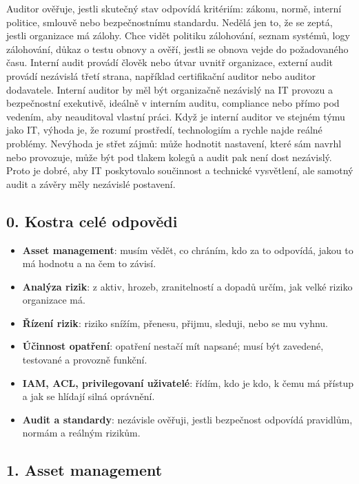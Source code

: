 \begin{beigebox}
Auditor ověřuje, jestli skutečný stav odpovídá kritériím: zákonu, normě, interní politice, smlouvě nebo bezpečnostnímu standardu. Nedělá jen to, že se zeptá, jestli organizace má zálohy. Chce vidět politiku zálohování, seznam systémů, logy zálohování, důkaz o testu obnovy a ověří, jestli se obnova vejde do požadovaného času. Interní audit provádí člověk nebo útvar uvnitř organizace, externí audit provádí nezávislá třetí strana, například certifikační auditor nebo auditor dodavatele. Interní auditor by měl být organizačně nezávislý na IT provozu a bezpečnostní exekutivě, ideálně v interním auditu, compliance nebo přímo pod vedením, aby neauditoval vlastní práci. Když je interní auditor ve stejném týmu jako IT, výhoda je, že rozumí prostředí, technologiím a rychle najde reálné problémy. Nevýhoda je střet zájmů: může hodnotit nastavení, které sám navrhl nebo provozuje, může být pod tlakem kolegů a audit pak není dost nezávislý. Proto je dobré, aby IT poskytovalo součinnost a technické vysvětlení, ale samotný audit a závěry měly nezávislé postavení.
\end{beigebox}

\subsection*{0. Kostra celé odpovědi}

\begin{itemize}
    \item \textbf{Asset management}: musím vědět, co chráním, kdo za to odpovídá, jakou to má hodnotu a na čem to závisí.
    \item \textbf{Analýza rizik}: z aktiv, hrozeb, zranitelností a dopadů určím, jak velké riziko organizace má.
    \item \textbf{Řízení rizik}: riziko snížím, přenesu, přijmu, sleduji, nebo se mu vyhnu.
    \item \textbf{Účinnost opatření}: opatření nestačí mít napsané; musí být zavedené, testované a provozně funkční.
    \item \textbf{IAM, ACL, privilegovaní uživatelé}: řídím, kdo je kdo, k čemu má přístup a jak se hlídají silná oprávnění.
    \item \textbf{Audit a standardy}: nezávisle ověřuji, jestli bezpečnost odpovídá pravidlům, normám a reálným rizikům.
\end{itemize}

\subsection*{1. Asset management}

